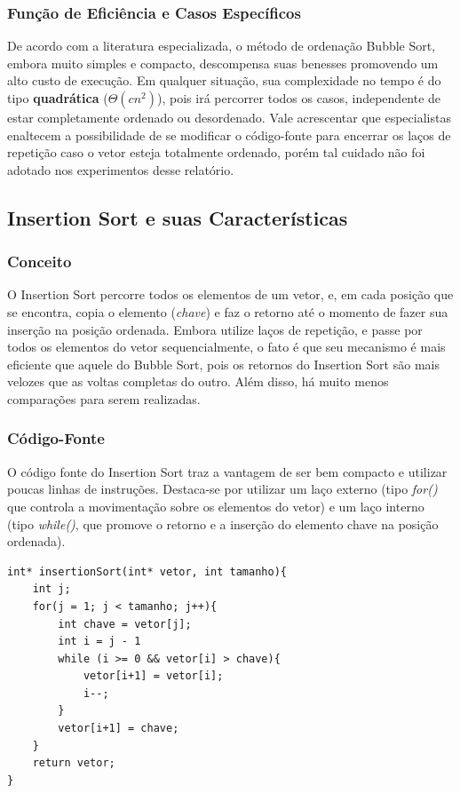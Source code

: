 \documentclass[a4paper, 12pt]{article}
\begin{document}
\subsubsection{Função de Eficiência e Casos Específicos}
\tab{}De acordo com a literatura especializada, o método de ordenação Bubble Sort, embora muito simples e compacto, descompensa suas benesses promovendo um alto custo de execução. Em qualquer situação, sua complexidade no tempo é do tipo \textbf{quadrática} ($\varTheta(cn^2)$), pois irá percorrer todos os casos, independente de estar completamente ordenado ou desordenado. Vale acrescentar que especialistas enaltecem a possibilidade de se modificar o código-fonte para encerrar os laços de repetição caso o vetor esteja totalmente ordenado, porém tal cuidado não foi adotado nos experimentos desse relatório.

\vspace{0.9cm}
\subsection{Insertion Sort e suas Características}

\subsubsection{Conceito} 
\tab{} O Insertion Sort percorre todos os elementos de um vetor, e, em cada posição que se encontra, copia o elemento (\textit{chave}) e faz o retorno até o momento de fazer sua inserção na posição ordenada. Embora utilize laços de repetição, e passe por todos os elementos do vetor sequencialmente, o fato é que seu mecanismo é mais eficiente que aquele do Bubble Sort, pois os retornos do Insertion Sort são mais velozes que as voltas completas do outro. Além disso, há muito menos comparações para serem realizadas.

\subsubsection{Código-Fonte} 
\tab{} O código fonte do Insertion Sort traz a vantagem de ser bem compacto e utilizar poucas linhas de instruções. Destaca-se por utilizar um laço externo (tipo \textit{for()} que controla a movimentação sobre os elementos do vetor) e um laço interno (tipo \textit{while()}, que promove o retorno e a inserção do elemento chave na posição ordenada).
\begin{verbatim}
int* insertionSort(int* vetor, int tamanho){
    int j;
    for(j = 1; j < tamanho; j++){
        int chave = vetor[j];               
        int i = j - 1                       
        while (i >= 0 && vetor[i] > chave){                                             
            vetor[i+1] = vetor[i];
            i--;
        }
        vetor[i+1] = chave;
    }	
    return vetor;
}
\end{verbatim}
\end{document}
